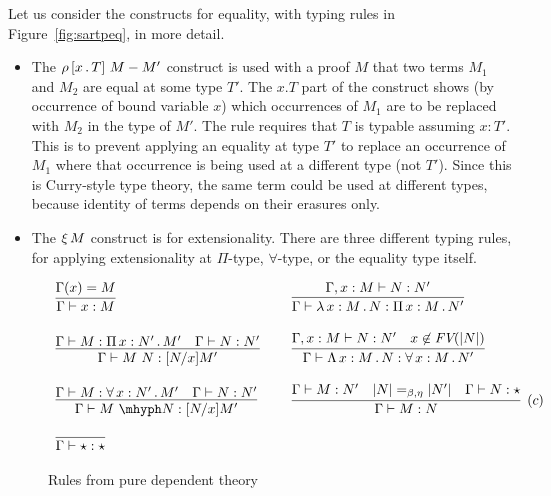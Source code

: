 \documentclass{article}
\begin{document}
Let us consider the constructs for equality, with typing rules in Figure~\ref{fig:sartpeq}, in more detail.

\begin{itemize}
\item The $\rho\, [x\,.\,T]\ M - M'$ construct is used with a proof $M$ that two terms $M_1$ and $M_2$ are
  equal at some type $T'$.  The $x.T$ part of the construct shows (by occurrence of bound variable $x$)
  which occurrences of $M_1$ are to
  be replaced with $M_2$ in the type of $M'$.  The rule requires that $T$ is typable assuming $x : T'$.
  This is to prevent applying an equality at type $T'$ to replace an occurrence of $M_1$ where that
  occurrence is being used at a different type (not $T'$).  Since this is Curry-style type theory,
  the same term could be used at different types, because identity of terms depends on their erasures only.
\item The $\xi\, M$ construct is for extensionality.  There are three different typing rules,
  for applying extensionality at $\Pi$-type, $\forall$-type, or the equality type itself.
\end{itemize}



\begin{figure}
\[
\begin{array}{lll}
  \infer{\Gamma\vdash x : M}{\Gamma(x) = M}
  &\ &
  \infer{\Gamma\vdash \tlam{x}{M}{N} : \Pia{x}{M}{N'}}{\Gamma,x:M\vdash N : N'}
  \\ \\
  \infer{\Gamma\vdash M\ N: [N/x]M'}{\Gamma\vdash M:\Pia{x}{N'}{M'} & \Gamma \vdash N:N'}
  &\ &
  \infer{\Gamma\vdash \Tlam{x}{M}{N} : \allt{x}{M}{N'}}{\Gamma,x:M\vdash N : N' & x\not\in\textit{FV}(|N|)}
  \\ \\
  \infer{\Gamma\vdash \appe{M}{N}: [N/x]M'}{\Gamma\vdash M:\allt{x}{N'}{M'} & \Gamma \vdash N:N'}
  &\ &
  \infer[(c)]{\Gamma \vdash M : N}{\Gamma \vdash M : N' & |N| =_{\beta,\eta} |N'| & \Gamma\vdash N:\star}
  \\ \\
    \infer{\Gamma \vdash \star : \star}{\ }
&\ &\ 
\end{array}
\]
\caption{Rules from pure dependent theory}
\label{fig:sartpdep}
\end{figure}
\end{document}
